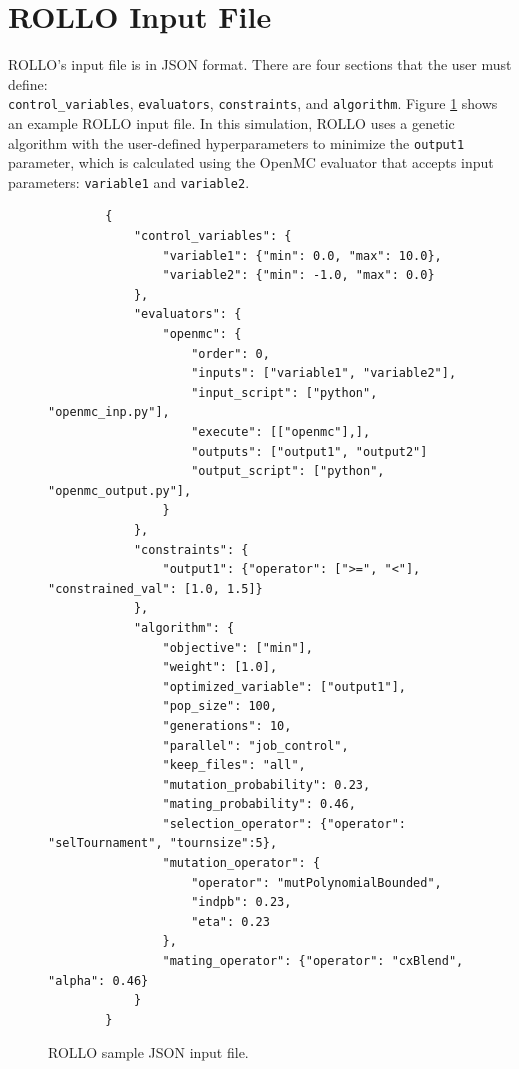 \section{ROLLO Input File}
\gls{ROLLO}'s input file is in JSON format. 
There are four sections that the user must define: \\ \texttt{control\_variables}, 
\texttt{evaluators}, \texttt{constraints}, and \texttt{algorithm}. 
Figure \ref{fig:rollo-input} shows an example \gls{ROLLO} input file. 
In this simulation, \gls{ROLLO} uses a genetic algorithm with the user-defined 
hyperparameters to minimize the \texttt{output1} parameter, which is 
calculated using the OpenMC evaluator that accepts input parameters: 
\texttt{variable1} and \texttt{variable2}. 
\begin{figure}[]
    \begin{verbatim}
        {
            "control_variables": {
                "variable1": {"min": 0.0, "max": 10.0}, 
                "variable2": {"min": -1.0, "max": 0.0}
            }, 
            "evaluators": {
                "openmc": {
                    "order": 0,
                    "inputs": ["variable1", "variable2"],
                    "input_script": ["python", "openmc_inp.py"],
                    "execute": [["openmc"],],
                    "outputs": ["output1", "output2"]
                    "output_script": ["python", "openmc_output.py"], 
                }
            }, 
            "constraints": {
                "output1": {"operator": [">=", "<"], "constrained_val": [1.0, 1.5]}
            }, 
            "algorithm": {
                "objective": ["min"], 
                "weight": [1.0],
                "optimized_variable": ["output1"], 
                "pop_size": 100, 
                "generations": 10, 
                "parallel": "job_control",
                "keep_files": "all",
                "mutation_probability": 0.23,
                "mating_probability": 0.46,
                "selection_operator": {"operator": "selTournament", "tournsize":5},
                "mutation_operator": {
                    "operator": "mutPolynomialBounded",
                    "indpb": 0.23,
                    "eta": 0.23
                },
                "mating_operator": {"operator": "cxBlend", "alpha": 0.46}
            }
        }
    \end{verbatim}
    \caption{\acrfull{ROLLO} sample JSON input file.}
    \label{fig:rollo-input}
\end{figure}

